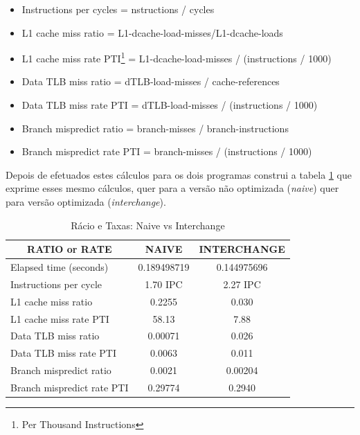 \documentclass[conference,compsoc]{IEEEtran}
\begin{document}
\begin{itemize}
	\item Instructions per cycles = nstructions / cycles
	\item L1 cache miss ratio = L1-dcache-load-misses/L1-dcache-loads 
	\item L1 cache miss rate PTI\footnote{Per Thousand Instructions} = L1-dcache-load-misses / (instructions / 1000)
	\item Data TLB miss ratio = dTLB-load-misses / cache-references
	\item Data TLB miss rate PTI = dTLB-load-misses / (instructions / 1000)
	\item Branch mispredict ratio = branch-misses / branch-instructions
	\item Branch mispredict rate PTI = branch-misses / (instructions / 1000)
\end{itemize}

Depois de efetuados estes cálculos para os dois programas construi a tabela \ref{table:ratios} que exprime esses mesmo cálculos, quer para a versão não optimizada (\textit{naive}) quer para versão optimizada (\textit{interchange}).

\begin{table}[h!]
\centering
\begin{tabular}{|l|c|c|}
\hline
\multicolumn{1}{|c|}{\textbf{RATIO or RATE}} & \textbf{NAIVE} & \textbf{INTERCHANGE} \\ \hline
Elapsed time (seconds)                    & 0.189498719    & 0.144975696          \\ \hline
Instructions per cycle                    & 1.70 IPC       & 2.27 IPC             \\ \hline
L1 cache miss ratio                       & 0.2255         & 0.030                \\ \hline
L1 cache miss rate PTI                    & 58.13          & 7.88                 \\ \hline
Data TLB miss ratio                       & 0.00071        & 0.026                \\ \hline
Data TLB miss rate PTI                    & 0.0063         & 0.011                \\ \hline
Branch mispredict ratio                   & 0.0021         & 0.00204              \\ \hline
Branch mispredict rate PTI                & 0.29774        & 0.2940               \\ \hline
\end{tabular}
\caption{Rácio e Taxas: Naive vs Interchange}
\label{table:ratios}
\end{table}
\end{document}
